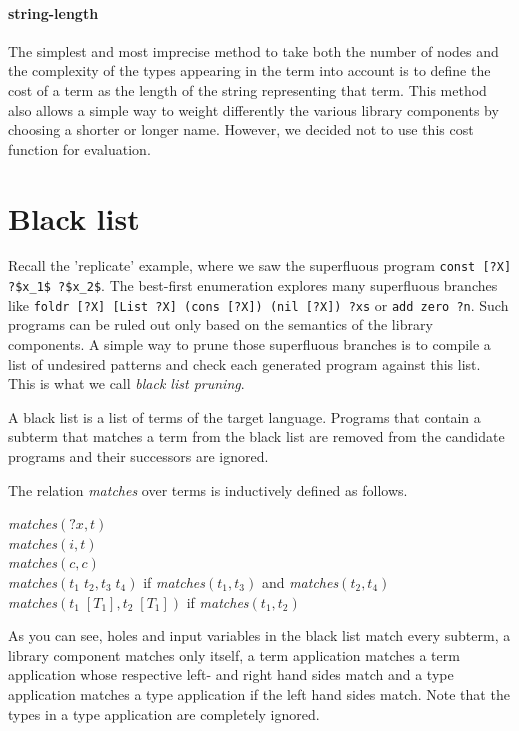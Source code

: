   \paragraph{string-length}
The simplest and most imprecise method to take both the number of nodes and the complexity of the types appearing in the term into account is to define the cost of a term as the length of the string representing that term. This method also allows a simple way to weight differently the various library components by choosing a shorter or longer name. However, we decided not to use this cost function for evaluation.

\section{Black list}\label{Black list}
Recall the 'replicate' example, where we saw the superfluous program \lstinline!const [?X] ?$x_1$ ?$x_2$!. The best-first enumeration explores many superfluous branches like \lstinline!foldr [?X] [List ?X] (cons [?X]) (nil [?X]) ?xs! or \lstinline!add zero ?n!. Such programs can be ruled out only based on the semantics of the library components. A simple way to prune those superfluous branches is to compile a list of undesired patterns and check each generated program against this list. This is what we call \emph{black list pruning}.

A black list is a list of terms of the target language. Programs that contain a subterm that matches a term from the black list are removed from the candidate programs and their successors are ignored.

The relation \textit{matches} over terms is inductively defined as follows.
\begin{algorithm*}
\textit{matches}$({?x},t)$\\
\textit{matches}$(i,t)$\\
\textit{matches}$(c,c)$\\
\textit{matches}$(t_1\; t_2,t_3\; t_4)$ if \textit{matches}$(t_1,t_3)$ and \textit{matches}$(t_2,t_4)$\\
\textit{matches}$(t_1\; [T_1],t_2\; [T_1])$ if \textit{matches}$(t_1,t_2)$\\
\end{algorithm*}
As you can see, holes and input variables in the black list match every subterm, a library component matches only itself, a term application matches a term application whose respective left- and right hand sides match and a type application matches a type application if the left hand sides match. Note that the types in a type application are completely ignored.

